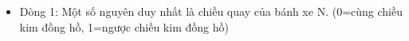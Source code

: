 \begin{itemize}
	\item     Dòng 1: Một số nguyên duy nhất là chiều quay của bánh xe N.         (0=cùng chiều kim đồng hồ, 1=ngược chiều kim đồng hồ)   
\end{itemize}

\